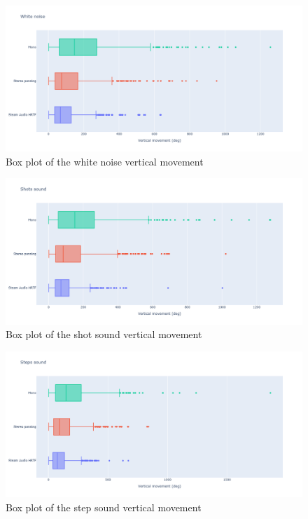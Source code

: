 \documentclass[conference]{IEEEtran}
\begin{document}
\begin{figure}[htbp]
\centerline{\includegraphics[scale=0.22]{white_ver.png}}
\caption{Box plot of the white noise vertical movement}
\label{fig9}
\end{figure}
\begin{figure}[htbp]
\centerline{\includegraphics[scale=0.22]{shot_ver.png}}
\caption{Box plot of the shot sound vertical movement}
\label{fig10}
\end{figure}
\begin{figure}[htbp]
\centerline{\includegraphics[scale=0.22]{step_ver.png}}
\caption{Box plot of the step sound vertical movement}
\label{fig11}
\end{figure}
\clearpage
\end{document}
